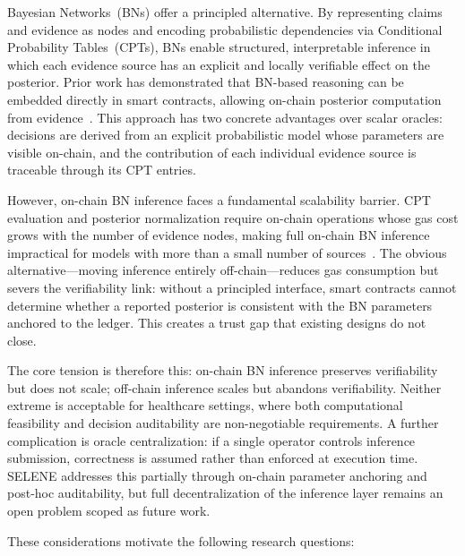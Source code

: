 \documentclass[journal]{IEEEtran}
\theoremstyle{definition}
\theoremstyle{remark}
\begin{document}
Bayesian Networks~(BNs) offer a principled alternative.
By representing claims and evidence as nodes and encoding
probabilistic dependencies via Conditional Probability
Tables~(CPTs), BNs enable structured, interpretable
inference in which each evidence source has an explicit
and locally verifiable effect on the posterior.
Prior work has demonstrated that BN-based reasoning can be
embedded directly in smart contracts, allowing on-chain
posterior computation from evidence~\cite{naeem2025evidence}.
This approach has two concrete advantages over scalar
oracles: decisions are derived from an explicit
probabilistic model whose parameters are visible on-chain,
and the contribution of each individual evidence source is
traceable through its CPT entries.

However, on-chain BN inference faces a fundamental
scalability barrier.
CPT evaluation and posterior normalization require
on-chain operations whose gas cost grows with the number
of evidence nodes, making full on-chain BN inference
impractical for models with more than a small number of
sources~\cite{naeem2025evidence}.
The obvious alternative---moving inference entirely
off-chain---reduces gas consumption but severs the
verifiability link: without a principled interface, smart
contracts cannot determine whether a reported posterior is
consistent with the BN parameters anchored to the ledger.
This creates a trust gap that existing designs do not
close.

The core tension is therefore this: on-chain BN inference
preserves verifiability but does not scale; off-chain
inference scales but abandons verifiability.
Neither extreme is acceptable for healthcare settings,
where both computational feasibility and decision
auditability are non-negotiable requirements.
A further complication is oracle centralization: if a
single operator controls inference submission, correctness
is assumed rather than enforced at execution time.
SELENE addresses this partially through on-chain parameter
anchoring and post-hoc auditability, but full
decentralization of the inference layer remains an open
problem scoped as future work.

These considerations motivate the following research
questions:
\end{document}

